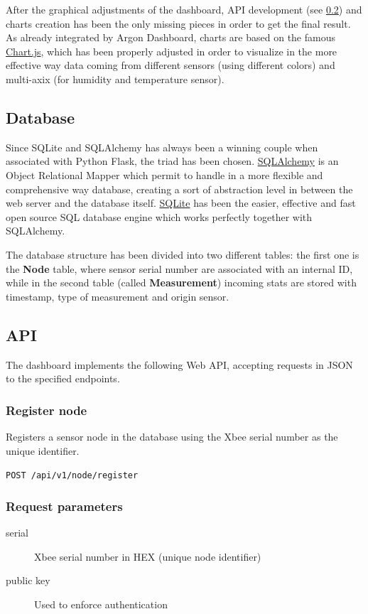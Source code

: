 \documentclass[a4paper,11pt]{scrartcl}
\begin{document}
After the graphical adjustments of the dashboard, API development (see \ref{subsec:api}) and charts creation has been the only missing pieces in order to get the final result. As already integrated by Argon Dashboard, charts are based on the famous \href{https://www.chartjs.org/}{Chart.js}, which has been properly adjusted in order to visualize in the more effective way data coming from different sensors (using different colors) and multi-axix (for humidity and temperature sensor).

\subsection{Database}\label{subsec:database}
Since SQLite and SQLAlchemy has always been a winning couple when associated with Python Flask, the triad has been chosen.
\href{https://www.sqlalchemy.org/}{SQLAlchemy} is an Object Relational Mapper which permit to handle in a more flexible and comprehensive way database, creating a sort of abstraction level in between the web server and the database itself. \href{https://www.sqlite.org/index.html}{SQLite} has been the easier, effective and fast open source SQL database engine which works perfectly together with SQLAlchemy.

The database structure has been divided into two different tables: the first one is the \textbf{Node} table, where sensor serial number are associated with an internal ID, while in the second table (called \textbf{Measurement}) incoming stats are stored with timestamp, type of measurement and origin sensor.

\subsection{API}\label{subsec:api}
The dashboard implements the following Web API, accepting requests in JSON to the specified endpoints.

\subsubsection{Register node}
Registers a sensor node in the database using the Xbee serial number as the unique identifier.

\texttt{POST /api/v1/node/register}

\subsubsection*{Request parameters}
\begin{description}
\item[serial] Xbee serial number in HEX (unique node identifier)
\item[public key] Used to enforce authentication 
\end{description}
\end{document}
